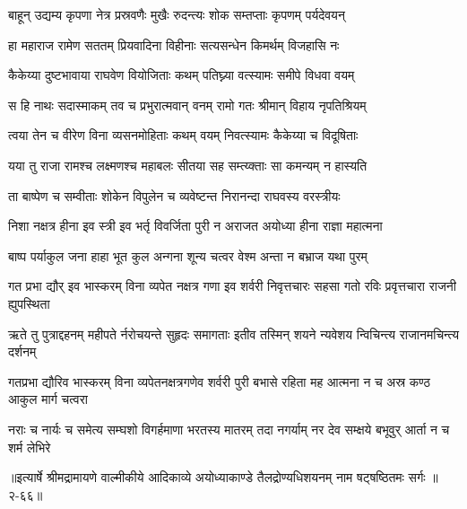 \twolineshloka
{बाहून् उद्यम्य कृपणा नेत्र प्रस्रवणैः मुखैः}
{रुदन्त्यः शोक सम्तप्ताः कृपणम् पर्यदेवयन्} %

\twolineshloka
{हा महाराज रामेण सततम् प्रियवादिना}
{विहीनाः सत्यसन्धेन किमर्थम् विजहासि नः} %

\twolineshloka
{कैकेय्या दुष्टभावाया राघवेण वियोजिताः}
{कथम् पतिघ्न्या वत्स्यामः समीपे विधवा वयम्} %

\twolineshloka
{स हि नाथः सदास्माकम् तव च प्रभुरात्मवान्}
{वनम् रामो गतः श्रीमान् विहाय नृपतिश्रियम्} %

\twolineshloka
{त्वया तेन च वीरेण विना व्यसनमोहिताः}
{कथम् वयम् निवत्स्यामः कैकेय्या च विदूषिताः} %

\twolineshloka
{यया तु राजा रामश्च लक्ष्मणश्च महाबलः}
{सीतया सह सम्त्य्क्ताः सा कमन्यम् न हास्यति} %

\twolineshloka
{ता बाष्पेण च सम्वीताः शोकेन विपुलेन च}
{व्यवेष्टन्त निरानन्दा राघवस्य वरस्त्रीयः} %

\twolineshloka
{निशा नक्षत्र हीना इव स्त्री इव भर्तृ विवर्जिता}
{पुरी न अराजत अयोध्या हीना राज्ञा महात्मना} %

\twolineshloka
{बाष्प पर्याकुल जना हाहा भूत कुल अन्गना}
{शून्य चत्वर वेश्म अन्ता न बभ्राज यथा पुरम्} %

\fourlineindentedshloka
{गत प्रभा द्यौर् इव भास्करम् विना}
{व्यपेत नक्षत्र गणा इव शर्वरी}
{निवृत्तचारः सहसा गतो रविः}
{प्रवृत्तचारा राजनी ह्युपस्थिता} %

\fourlineindentedshloka
{ऋते तु पुत्राद्दहनम् महीपते}
{र्नरोचयन्ते सुहृदः समागताः}
{इतीव तस्मिन् शयने न्यवेशय}
{न्विचिन्त्य राजानमचिन्त्य दर्शनम्} %

\fourlineindentedshloka
{गतप्रभा द्यौरिव भास्करम् विना}
{व्यपेतनक्षत्रगणेव शर्वरी}
{पुरी बभासे रहिता मह आत्मना}
{न च अस्र कण्ठ आकुल मार्ग चत्वरा} %

\fourlineindentedshloka
{नराः च नार्यः च समेत्य सम्घशो}
{विगर्हमाणा भरतस्य मातरम्}
{तदा नगर्याम् नर देव सम्क्षये}
{बभूवुर् आर्ता न च शर्म लेभिरे} %


॥इत्यार्षे श्रीमद्रामायणे वाल्मीकीये आदिकाव्ये अयोध्याकाण्डे तैलद्रोण्यधिशयनम् नाम षट्षष्ठितमः सर्गः ॥२-६६॥
